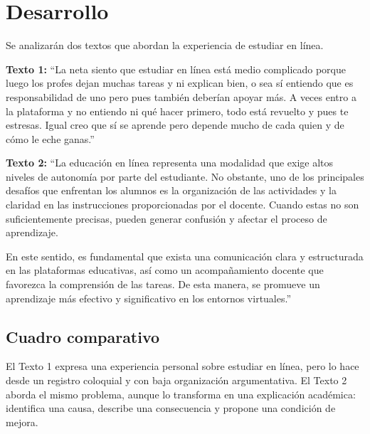 \documentclass[
	spanish, %
	letterpaper, oneside
]{article}
\begin{document}
\section{Desarrollo}

Se analizarán dos textos que abordan la experiencia de estudiar en línea.

\textbf{Texto 1:} ``La neta siento que estudiar en línea está medio complicado porque luego los profes dejan muchas tareas y ni explican bien, o sea sí entiendo que es responsabilidad de uno pero pues también deberían apoyar más. A veces entro a la plataforma y no entiendo ni qué hacer primero, todo está revuelto y pues te estresas. Igual creo que sí se aprende pero depende mucho de cada quien y de cómo le eche ganas.''

\textbf{Texto 2:} ``La educación en línea representa una modalidad que exige altos niveles de autonomía por parte del estudiante. No obstante, uno de los principales desafíos que enfrentan los alumnos es la organización de las actividades y la claridad en las instrucciones proporcionadas por el docente. Cuando estas no son suficientemente precisas, pueden generar confusión y afectar el proceso de aprendizaje. 

En este sentido, es fundamental que exista una comunicación clara y estructurada en las plataformas educativas, así como un acompañamiento docente que favorezca la comprensión de las tareas. De esta manera, se promueve un aprendizaje más efectivo y significativo en los entornos virtuales.'' 

\subsection{Cuadro comparativo}

El Texto 1 expresa una experiencia personal sobre estudiar en línea, pero lo hace desde un registro coloquial y con baja organización argumentativa. El Texto 2 aborda el mismo problema, aunque lo transforma en una explicación académica: identifica una causa, describe una consecuencia y propone una condición de mejora.
\end{document}
